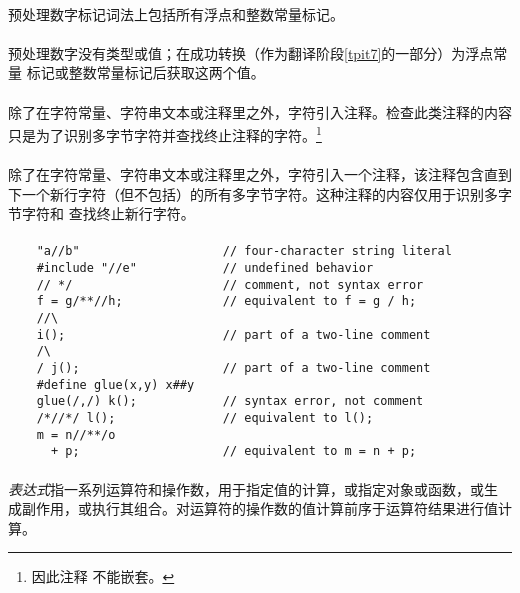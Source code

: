 {\paragraph{}
预处理数字标记词法上包括所有浮点和整数常量标记。

\semantic
\paragraph{}
预处理数字没有类型或值；在成功转换（作为翻译阶段\ref{tpit7}的一部分）为浮点常量
标记或整数常量标记后获取这两个值。

\paragraph{}
除了在字符常量、字符串文本或注释里之外，字符\tm{/*}引入注释。检查此类注释的内容
只是为了识别多字节字符并查找终止注释的字符\tm{*/}。\footnote{因此注释
不能嵌套。}

\paragraph{}
除了在字符常量、字符串文本或注释里之外，字符\tm{//}引入一个注释，该注释包含直到
下一个新行字符（但不包括）的所有多字节字符。这种注释的内容仅用于识别多字节字符和
查找终止新行字符。

\paragraph{}
\ex*
\begin{lstlisting}
    "a//b"                    // four-character string literal
    #include "//e"            // undefined behavior
    // */                     // comment, not syntax error
    f = g/**//h;              // equivalent to f = g / h;
    //\
    i();                      // part of a two-line comment
    /\
    / j();                    // part of a two-line comment
    #define glue(x,y) x##y
    glue(/,/) k();            // syntax error, not comment
    /*//*/ l();               // equivalent to l();
    m = n//**/o
      + p;                    // equivalent to m = n + p;
\end{lstlisting}

\paragraph{}
\textit{表达式}指一系列运算符和操作数，用于指定值的计算，或指定对象或函数，或生
成副作用，或执行其组合。对运算符的操作数的值计算前序于运算符结果进行值计算。

}
